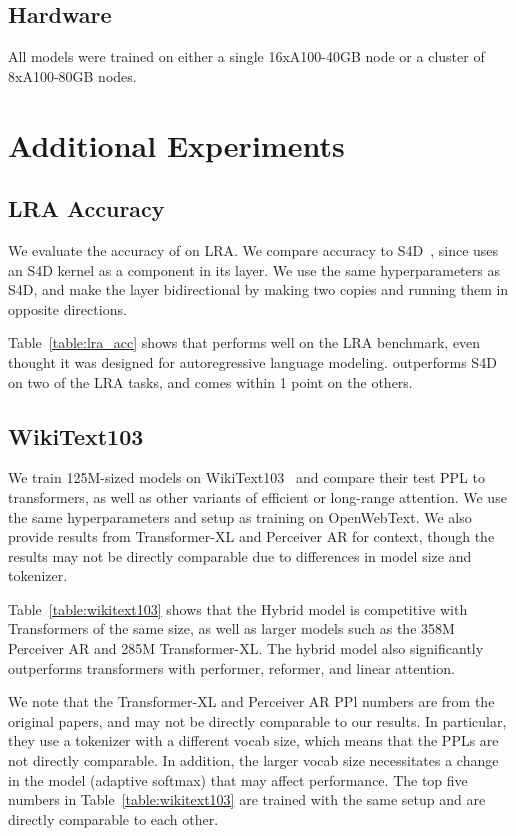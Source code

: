 \subsection{Hardware}
All models were trained on either a single 16xA100-40GB node or a cluster of 8xA100-80GB nodes.

\section{Additional Experiments}
\label{sec:app_additional_experiments}

\subsection{LRA Accuracy}
We evaluate the accuracy of \hthree on LRA.
We compare accuracy to S4D~\citep{gu2022parameterization}, since \hthree uses an S4D kernel as a component in its layer.
We use the same hyperparameters as S4D, and make the layer bidirectional by making two copies and running them in opposite directions.



Table~\ref{table:lra_acc} shows that \hthree performs well on the LRA benchmark, even thought it was designed for autoregressive language modeling.
\hthree outperforms S4D on two of the LRA tasks, and comes within 1 point on the others.

\subsection{WikiText103}
We train 125M-sized models on WikiText103~\citep{merity2016pointer} and compare their test PPL to transformers, as well as other variants of efficient or long-range attention.
We use the same hyperparameters and setup as training on OpenWebText.
We also provide results from Transformer-XL and Perceiver AR for context, though the results may not be directly comparable due to differences in model size and tokenizer.



Table~\ref{table:wikitext103} shows that the Hybrid \hthree model is competitive with Transformers of the same size, as well as larger models such as the 358M Perceiver AR and 285M Transformer-XL.
The hybrid \hthree model also significantly outperforms transformers with performer, reformer, and linear attention.

We note that the Transformer-XL and Perceiver AR PPl numbers are from the original papers, and may not be directly comparable to our results.
In particular, they use a tokenizer with a different vocab size, which means that the PPLs are not directly comparable.
In addition, the larger vocab size necessitates a change in the model (adaptive softmax) that may affect performance.
The top five numbers in Table~\ref{table:wikitext103} are trained with the same setup and are directly comparable to each other.

